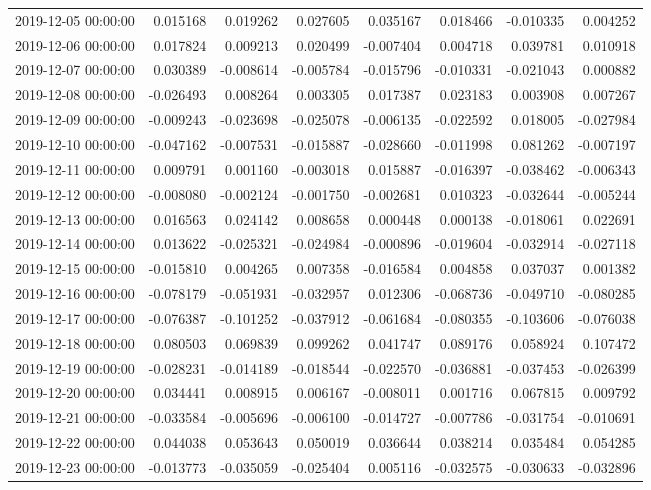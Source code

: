 \begin{tabular}{lrrrrrrr}
2019-12-05 00:00:00 & 0.015168 & 0.019262 & 0.027605 & 0.035167 & 0.018466 & -0.010335 & 0.004252 \\
2019-12-06 00:00:00 & 0.017824 & 0.009213 & 0.020499 & -0.007404 & 0.004718 & 0.039781 & 0.010918 \\
2019-12-07 00:00:00 & 0.030389 & -0.008614 & -0.005784 & -0.015796 & -0.010331 & -0.021043 & 0.000882 \\
2019-12-08 00:00:00 & -0.026493 & 0.008264 & 0.003305 & 0.017387 & 0.023183 & 0.003908 & 0.007267 \\
2019-12-09 00:00:00 & -0.009243 & -0.023698 & -0.025078 & -0.006135 & -0.022592 & 0.018005 & -0.027984 \\
2019-12-10 00:00:00 & -0.047162 & -0.007531 & -0.015887 & -0.028660 & -0.011998 & 0.081262 & -0.007197 \\
2019-12-11 00:00:00 & 0.009791 & 0.001160 & -0.003018 & 0.015887 & -0.016397 & -0.038462 & -0.006343 \\
2019-12-12 00:00:00 & -0.008080 & -0.002124 & -0.001750 & -0.002681 & 0.010323 & -0.032644 & -0.005244 \\
2019-12-13 00:00:00 & 0.016563 & 0.024142 & 0.008658 & 0.000448 & 0.000138 & -0.018061 & 0.022691 \\
2019-12-14 00:00:00 & 0.013622 & -0.025321 & -0.024984 & -0.000896 & -0.019604 & -0.032914 & -0.027118 \\
2019-12-15 00:00:00 & -0.015810 & 0.004265 & 0.007358 & -0.016584 & 0.004858 & 0.037037 & 0.001382 \\
2019-12-16 00:00:00 & -0.078179 & -0.051931 & -0.032957 & 0.012306 & -0.068736 & -0.049710 & -0.080285 \\
2019-12-17 00:00:00 & -0.076387 & -0.101252 & -0.037912 & -0.061684 & -0.080355 & -0.103606 & -0.076038 \\
2019-12-18 00:00:00 & 0.080503 & 0.069839 & 0.099262 & 0.041747 & 0.089176 & 0.058924 & 0.107472 \\
2019-12-19 00:00:00 & -0.028231 & -0.014189 & -0.018544 & -0.022570 & -0.036881 & -0.037453 & -0.026399 \\
2019-12-20 00:00:00 & 0.034441 & 0.008915 & 0.006167 & -0.008011 & 0.001716 & 0.067815 & 0.009792 \\
2019-12-21 00:00:00 & -0.033584 & -0.005696 & -0.006100 & -0.014727 & -0.007786 & -0.031754 & -0.010691 \\
2019-12-22 00:00:00 & 0.044038 & 0.053643 & 0.050019 & 0.036644 & 0.038214 & 0.035484 & 0.054285 \\
2019-12-23 00:00:00 & -0.013773 & -0.035059 & -0.025404 & 0.005116 & -0.032575 & -0.030633 & -0.032896 \\

\end{tabular}

